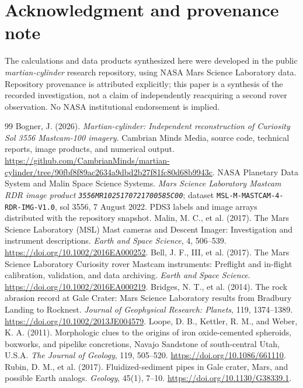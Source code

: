 \documentclass[11pt,letterpaper]{article}
\newcommand{\pdsid}{\texttt{3556MR1025170721700585C00}}
\begin{document}
\section*{Acknowledgment and provenance note}
The calculations and data products synthesized here were developed in the public \emph{martian-cylinder} research repository, using NASA Mars Science Laboratory data. Repository provenance is attributed explicitly; this paper is a synthesis of the recorded investigation, not a claim of independently reacquiring a second rover observation. No NASA institutional endorsement is implied.

\begin{thebibliography}{99}\setlength{\itemsep}{4pt}
 Bogner, J. (2026). \emph{Martian-cylinder: Independent reconstruction of Curiosity Sol 3556 Mastcam-100 imagery}. Cambrian Minds Media, source code, technical reports, image products, and numerical output. \url{https://github.com/CambrianMinds/martian-cylinder/tree/90fbf8f89ac2634a9dbd2b27f81fc80d68b9943c}.
 NASA Planetary Data System and Malin Space Science Systems. \emph{Mars Science Laboratory Mastcam RDR image product \pdsid}; dataset \texttt{MSL-M-MASTCAM-4-RDR-IMG-V1.0}, sol 3556, 7 August 2022. PDS3 labels and image arrays distributed with the repository snapshot.
 Malin, M. C., et al. (2017). The Mars Science Laboratory (MSL) Mast cameras and Descent Imager: Investigation and instrument descriptions. \emph{Earth and Space Science}, 4, 506--539. \url{https://doi.org/10.1002/2016EA000252}.
 Bell, J. F., III, et al. (2017). The Mars Science Laboratory Curiosity rover Mastcam instruments: Preflight and in-flight calibration, validation, and data archiving. \emph{Earth and Space Science}. \url{https://doi.org/10.1002/2016EA000219}.
 Bridges, N. T., et al. (2014). The rock abrasion record at Gale Crater: Mars Science Laboratory results from Bradbury Landing to Rocknest. \emph{Journal of Geophysical Research: Planets}, 119, 1374--1389. \url{https://doi.org/10.1002/2013JE004579}.
 Loope, D. B., Kettler, R. M., and Weber, K. A. (2011). Morphologic clues to the origins of iron oxide-cemented spheroids, boxworks, and pipelike concretions, Navajo Sandstone of south-central Utah, U.S.A. \emph{The Journal of Geology}, 119, 505--520. \url{https://doi.org/10.1086/661110}.
 Rubin, D. M., et al. (2017). Fluidized-sediment pipes in Gale crater, Mars, and possible Earth analogs. \emph{Geology}, 45(1), 7--10. \url{https://doi.org/10.1130/G38339.1}.

\end{thebibliography}
\end{document}
